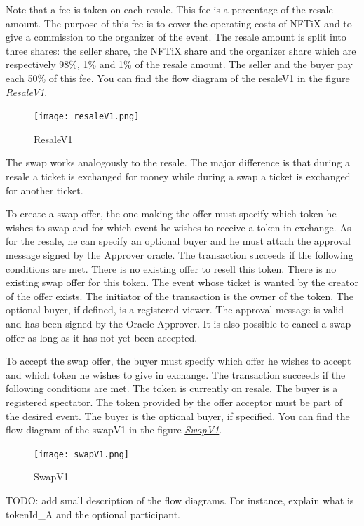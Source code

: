 \documentclass[a4paper,11pt,oneside]{report}
\begin{document}
Note that a fee is taken on each resale. This fee is a percentage of the resale amount. The purpose of this fee is to cover the operating costs of NFTiX and to give a commission to the organizer of the event. The resale amount is split into three shares: the seller share, the NFTiX share and the organizer share which are respectively 98\%, 1\% and 1\% of the resale amount. The seller and the buyer pay each 50\% of this fee. You can find the flow diagram of the resaleV1 in the figure \hyperref[fig:resaleV1]{ \textit{ResaleV1}}.

\begin{figure}[h!]
  \texttt{[image: resaleV1.png]}
  \caption{ResaleV1}
  \label{fig:resaleV1}
\end{figure}

The swap works analogously to the resale. The major difference is that during a resale a ticket is exchanged for money while during a swap a ticket is exchanged for another ticket.

To create a swap offer, the one making the offer must specify which token he wishes to swap and for which event he wishes to receive a token in exchange. As for the resale, he can specify an optional buyer and he must attach the approval message signed by the Approver oracle. The transaction succeeds if the following conditions are met. There is no existing offer to resell this token. There is no existing swap offer for this token. The event whose ticket is wanted by the creator of the offer exists. The initiator of the transaction is the owner of the token. The optional buyer, if defined, is a registered viewer. The approval message is valid and has been signed by the Oracle Approver. It is also possible to cancel a swap offer as long as it has not yet been accepted.

To accept the swap offer, the buyer must specify which offer he wishes to accept and which token he wishes to give in exchange. The transaction succeeds if the following conditions are met. The token is currently on resale. The buyer is a registered spectator. The token provided by the offer acceptor must be part of the desired event. The buyer is the optional buyer, if specified. You can find the flow diagram of the swapV1 in the figure \hyperref[fig:swapV1]{ \textit{SwapV1}}.

\begin{figure}[h!]
  \texttt{[image: swapV1.png]}
  \caption{SwapV1}
  \label{fig:swapV1}
\end{figure}

TODO: add small description of the flow diagrams. For instance, explain what is tokenId\_A and the optional participant.
\end{document}
